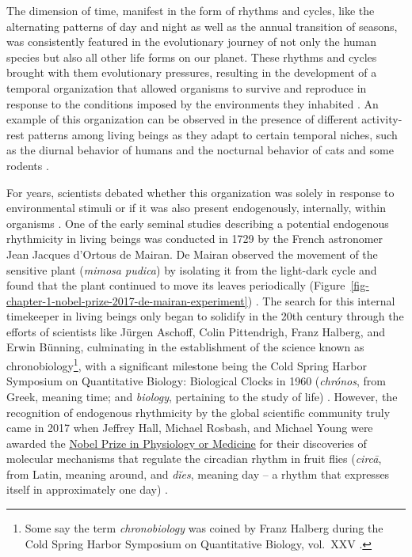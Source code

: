 \documentclass[
12pt,
openright,
oneside,
a4paper,
chapter=TITLE,
section=TITLE,
french,
spanish,
brazil,
english
]{abntex2}\usepackage{array}
\begin{document}
The dimension of time, manifest in the form of rhythms and cycles, like
the alternating patterns of day and night as well as the annual
transition of seasons, was consistently featured in the evolutionary
journey of not only the human species but also all other life forms on
our planet. These rhythms and cycles brought with them evolutionary
pressures, resulting in the development of a temporal organization that
allowed organisms to survive and reproduce in response to the conditions
imposed by the environments they inhabited
\autocite{pittendrigh1981,menna-barreto2003}. An example of this
organization can be observed in the presence of different activity-rest
patterns among living beings as they adapt to certain temporal niches,
such as the diurnal behavior of humans and the nocturnal behavior of
cats and some rodents \autocite{foster2005}.

For years, scientists debated whether this organization was solely in
response to environmental stimuli or if it was also present
endogenously, internally, within organisms \autocite{rotenberg2003}. One
of the early seminal studies describing a potential endogenous
rhythmicity in living beings was conducted in 1729 by the French
astronomer Jean Jacques d'Ortous de Mairan. De Mairan observed the
movement of the sensitive plant (\emph{mimosa pudica}) by isolating it
from the light-dark cycle and found that the plant continued to move its
leaves periodically
(Figure~\ref{fig-chapter-1-nobel-prize-2017-de-mairan-experiment})
\autocite{foster2005,rotenberg2003}. The search for this internal
timekeeper in living beings only began to solidify in the 20th century
through the efforts of scientists like Jürgen Aschoff, Colin
Pittendrigh, Franz Halberg, and Erwin Bünning, culminating in the
establishment of the science known as chronobiology\footnote{Some say
  the term \emph{chronobiology} was coined by Franz Halberg during the
  Cold Spring Harbor Symposium on Quantitative Biology, vol.~XXV
  \autocite[p.~21]{menna-barreto2023}.}, with a significant milestone
being the Cold Spring Harbor Symposium on Quantitative Biology:
Biological Clocks in 1960 (\emph{chrónos}, from Greek, meaning time; and
\emph{biology}, pertaining to the study of life)
\autocite{rotenberg2003,coldspringharborlaboratory}. However, the
recognition of endogenous rhythmicity by the global scientific community
truly came in 2017 when Jeffrey Hall, Michael Rosbash, and Michael Young
were awarded the
\href{https://www.nobelprize.org/prizes/medicine/2017/press-release/}{Nobel
Prize in Physiology or Medicine} for their discoveries of molecular
mechanisms that regulate the circadian rhythm in fruit flies
(\emph{circā}, from Latin, meaning around, and \emph{dĭes}, meaning day
\autocite{latinitium} -- a rhythm that expresses itself in approximately
one day) \autocite{nobelprizeoutreachab}.
\end{document}
